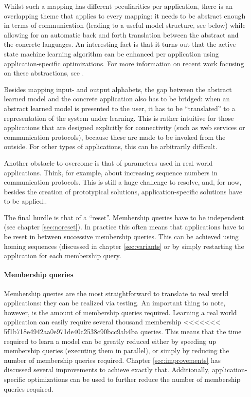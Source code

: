 \documentclass[multi,crop=false,class=article]{standalone}
\begin{document}
Whilst such a mapping has different peculiarities per application, there is an
overlapping theme that applies to every mapping: it needs to be abstract enough
in terms of communication (leading to a useful model structure, see below) while
allowing for an automatic back and forth translation between the abstract and
the concrete languages\cite{Steffen11a}. An interesting fact is that it turns
out that the active state machine learning algorithm can be enhanced per
application using application-specific optimizations\cite{Hungar03}. For more
information on recent work focusing on these abstractions, see
\cite{Aarts10,Howar11,Jonsson11}.

Besides mapping input- and output alphabets, the gap between the abstract
learned model and the concrete application also has to be bridged: when an
abstract learned model is presented to the user, it has to be ``translated'' to
a representation of the system under learning. This is rather intuitive for
those applications that are designed explicitly for connectivity (such as web
services or communication protocols), because these are made to be invoked from
the outside. For other types of applications, this can be arbitrarily difficult.

Another obstacle to overcome is that of parameters used in real world
applications. Think, for example, about increasing sequence numbers in
communication protocols. This is still a huge challenge to
resolve\cite{Steffen11a}, and, for now, besides the creation of prototypical
solutions\cite{Aarts10,Shahbaz07,Howar10}, application-specific solutions have
to be applied.\cite{Steffen11a}.

The final hurdle is that of a ``reset''. Membership queries have to be
independent (see chapter \cref{sec:noreset}). In practice this often means that
applications have to be reset in between successive membership queries. This can
be achieved using homing sequences\cite{Rivest93} (discussed in chapter
\cref{sec:variants} or by simply restarting the application for each membership
query.

\paragraph{Membership queries} Membership queries are the most straightforward
to translate to real world applications: they can be realized via testing. An
important thing to note, however, is the amount of membership queries required.
Learning a real world application can easily require several thousand membership
<<<<<<< 5f1b718e4942aa0e971de40c2538c90bcc9ab4ba
queries. This means that the time required to learn a model
can be greatly reduced either by speeding up membership queries (executing them
in parallel), or simply by reducing the number of membership queries required.
Chapter \cref{sec:improvements} has discussed several improvements to achieve
exactly that. Additionally, application-specific optimizations can be used to
further reduce the number of membership queries required.
\end{document}
